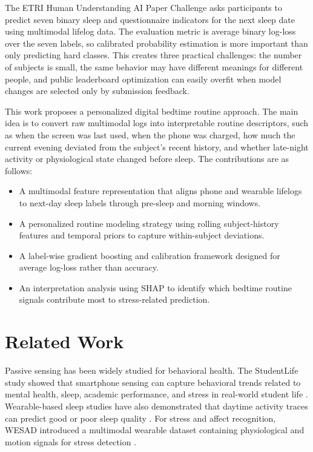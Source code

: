\documentclass[conference]{IEEEtran}
\begin{document}
The ETRI Human Understanding AI Paper Challenge asks participants to predict seven binary sleep and questionnaire indicators for the next sleep date using multimodal lifelog data. The evaluation metric is average binary log-loss over the seven labels, so calibrated probability estimation is more important than only predicting hard classes. This creates three practical challenges: the number of subjects is small, the same behavior may have different meanings for different people, and public leaderboard optimization can easily overfit when model changes are selected only by submission feedback.

This work proposes a personalized digital bedtime routine approach. The main idea is to convert raw multimodal logs into interpretable routine descriptors, such as when the screen was last used, when the phone was charged, how much the current evening deviated from the subject's recent history, and whether late-night activity or physiological state changed before sleep. The contributions are as follows:
\begin{itemize}
    \item A multimodal feature representation that aligns phone and wearable lifelogs to next-day sleep labels through pre-sleep and morning windows.
    \item A personalized routine modeling strategy using rolling subject-history features and temporal priors to capture within-subject deviations.
    \item A label-wise gradient boosting and calibration framework designed for average log-loss rather than accuracy.
    \item An interpretation analysis using SHAP to identify which bedtime routine signals contribute most to stress-related prediction.
\end{itemize}

\section{Related Work}
Passive sensing has been widely studied for behavioral health. The StudentLife study showed that smartphone sensing can capture behavioral trends related to mental health, sleep, academic performance, and stress in real-world student life \cite{wang2014studentlife}. Wearable-based sleep studies have also demonstrated that daytime activity traces can predict good or poor sleep quality \cite{sathyanarayana2016sleep}. For stress and affect recognition, WESAD introduced a multimodal wearable dataset containing physiological and motion signals for stress detection \cite{schmidt2018wesad}.
\end{document}
